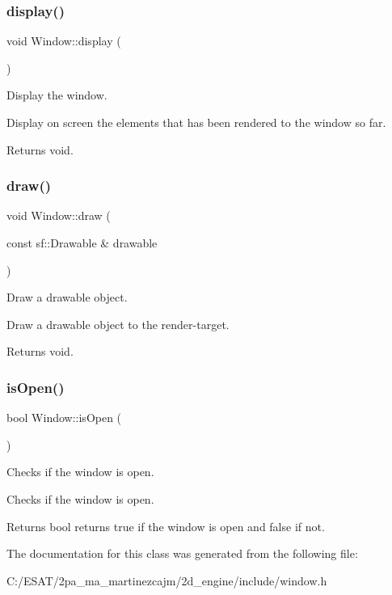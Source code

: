 \subsubsection{\texorpdfstring{display()}{display()}}
{\footnotesize\ttfamily void Window\+::display (\begin{DoxyParamCaption}{ }\end{DoxyParamCaption})}



Display the window. 

Display on screen the elements that has been rendered to the window so far.

\begin{DoxyReturn}{Returns}
void. 
\end{DoxyReturn}
\mbox{\label{class_window_adfb2d5826942693e289d13f314a341f7}} 
\subsubsection{\texorpdfstring{draw()}{draw()}}
{\footnotesize\ttfamily void Window\+::draw (\begin{DoxyParamCaption}\item[{const sf\+::\+Drawable \&}]{drawable }\end{DoxyParamCaption})}



Draw a drawable object. 

Draw a drawable object to the render-\/target.

\begin{DoxyReturn}{Returns}
void. 
\end{DoxyReturn}
\mbox{\label{class_window_a0530ead23b2c91ef90a5f98e4df41cb8}} 
\subsubsection{\texorpdfstring{is\+Open()}{isOpen()}}
{\footnotesize\ttfamily bool Window\+::is\+Open (\begin{DoxyParamCaption}{ }\end{DoxyParamCaption})}



Checks if the window is open. 

Checks if the window is open.

\begin{DoxyReturn}{Returns}
bool returns true if the window is open and false if not. 
\end{DoxyReturn}


The documentation for this class was generated from the following file\+:\begin{DoxyCompactItemize}
\item 
C\+:/\+E\+S\+A\+T/2pa\+\_\+ma\+\_\+martinezcajm/2d\+\_\+engine/include/window.\+h\end{DoxyCompactItemize}
